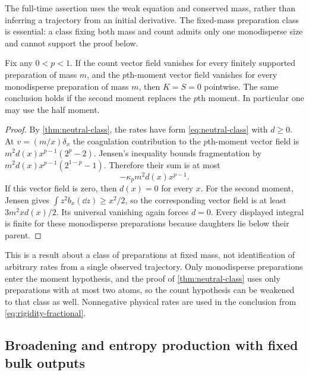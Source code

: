 The full-time assertion uses the weak equation and conserved mass, rather
than inferring a trajectory from an initial derivative. The fixed-mass
preparation class is essential: a class fixing both mass and count admits
only one monodisperse size and cannot support the proof below.

\begin{proposition}
\label{prop:observable-rigidity}
Fix any $0<p<1$. If the count vector field vanishes for every finitely
supported preparation of mass $m$, and the $p$th-moment vector field
vanishes for every monodisperse preparation of mass $m$, then
$K=S=0$ pointwise. The same conclusion holds if the second moment replaces
the $p$th moment. In particular one may use the half moment.
\end{proposition}

\begin{proof}
By \cref{thm:neutral-class}, the rates have form \eqref{eq:neutral-class}
with $d\geq0$. At $v=(m/x)\delta_x$ the coagulation contribution to the
$p$th-moment vector field is
$m^2d(x)x^{p-1}(2^p-2)$. Jensen's inequality bounds fragmentation by
$m^2d(x)x^{p-1}(2^{1-p}-1)$. Therefore their sum is at most
\begin{equation}
 -\kappa_p m^2d(x)x^{p-1}.
 \label{eq:rigidity-fractional}
\end{equation}
If this vector field is zero, then $d(x)=0$ for every $x$.
For the second moment, Jensen gives
$\int z^2b_x(\dd z)\geq x^2/2$, so the corresponding vector field is
at least $3m^2xd(x)/2$. Its universal vanishing again forces $d=0$.
Every displayed integral is finite for these monodisperse preparations
because daughters lie below their parent.
\end{proof}

This is a result about a class of preparations at fixed mass, not
identification of arbitrary rates from a single observed trajectory.
Only monodisperse preparations enter the moment hypothesis, and the proof
of \cref{thm:neutral-class} uses only preparations with at most two atoms,
so the count hypothesis can be weakened to that class as well. Nonnegative
physical rates are used in the conclusion from
\eqref{eq:rigidity-fractional}.

\subsection{Broadening and entropy production with fixed bulk outputs}

